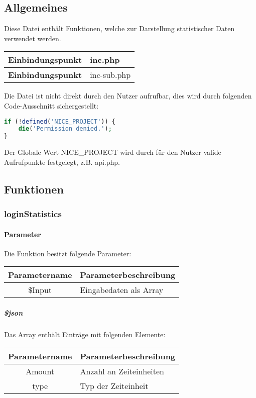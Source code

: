 \subsection{Allgemeines} Diese Datei enthält Funktionen, welche zur Darstellung statistischer Daten verwendet werden.
\begin{table}[H]
	\begin{tabular}{|c|p{11cm}|}
		\hline
		\textbf{Einbindungspunkt} & inc.php \\ \hline
		\textbf{Einbindungspunkt} & inc-sub.php \\ \hline
	\end{tabular}
\end{table}
Die Datei ist nicht direkt durch den Nutzer aufrufbar, dies wird durch folgenden Code-Ausschnitt sichergestellt:
\begin{lstlisting}[language=php]
if (!defined('NICE_PROJECT')) {
	die('Permission denied.');
}
\end{lstlisting}
Der Globale Wert {\glqq NICE\_PROJECT\grqq} wird durch für den Nutzer valide Aufrufpunkte festgelegt, z.B. {\glqq api.php\grqq}.
\newpage
\subsection{Funktionen}
\subsubsection{loginStatistics}
\paragraph{Parameter} Die Funktion besitzt folgende Parameter:
\begin{table}[H]
	\begin{tabular}{|c|p{11cm}|}
		\hline
		\textbf{Parametername} & \textbf{Parameterbeschreibung} \\ \hline
		\$Input & Eingabedaten als Array \\ \hline
	\end{tabular}
\end{table}
\subparagraph{\$json}Das Array enthält Einträge mit folgenden Elemente:
\begin{table}[H]
	\begin{tabular}{|c|p{11cm}|}
		\hline
		\textbf{Parametername} & \textbf{Parameterbeschreibung} \\ \hline
		Amount & Anzahl an Zeiteinheiten \\ \hline
		type   & Typ der Zeiteinheit \\ \hline
	\end{tabular}
\end{table}
